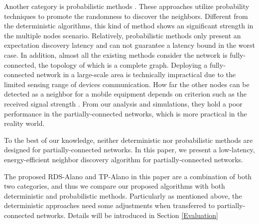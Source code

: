 Another category is probabilistic methods \cite{mcglynn2001birthday,
vasudevan2009neighbor,you2011aloha,song2014probabilistic}. These
approaches utilize probability techniques to promote the randomness 
to discover the neighbors. Different from the deterministic algorithms, 
this kind of method shows an significant strength in the multiple nodes scenario. 
Relatively, probabilistic methods only present an expectation discovery latency and 
can not guarantee a latency bound in the worst case.
In addition, almost all the existing methods consider the network is fully-connected,
the topology of which is a complete graph. Deploying a fully-connected network 
in a large-scale area is technically impractical 
due to the limited sensing range of devices communication.
How far the other nodes can be detected as a neighbor for a mobile equipment  
depends on criterion such as the received signal strength \cite{daiya2011experimental}.
From our analysis and simulations, 
they hold a poor performance in the partially-connected networks, which is more 
practical in the reality world.

To the best of our knowledge, neither deterministic nor probabilistic methods are designed for
partially-connected networks. In this paper, we present a low-latency, energy-efficient 
neighbor discovery algorithm for partially-connected networks.

The proposed RDS-Alano and TP-Alano in this paper are a combination of both two categories,
and thus we compare our proposed algorithms with both deterministic and probabilistic methods. 
Particularly as mentioned above, the deterministic approaches need some adjustments 
when transferred to partially-connected networks. Details will be introduced in Section \ref{Evaluation}




